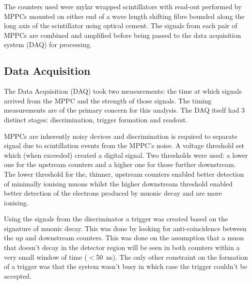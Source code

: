 \documentclass[]{article}
\begin{document}
The counters used were mylar wrapped scintillators with read-out performed by MPPCs mounted on either end of a wave length shifting fibre bounded along the long axis of the scintillator using optical cement. The signals from each pair of MPPCs are combined and amplified before being passed to the data acquisition system (DAQ) for processing.

\subsection{Data Acquisition} %
\label{sub:data_acquisition}
The Data Acquisition (DAQ) took two measurements: the time at which signals arrived from the MPPC and the strength of those signals. The timing measurements are of the primary concern for this analysis. The DAQ itself had 3 distinct stages: discrimination, trigger formation and readout.

MPPCs are inherently noisy devices and discrimination is required to separate signal due to scintillation events from the MPPC's noise. A voltage threshold set which (when exceeded) created a digital signal. Two thresholds were used: a lower one for the upstream counters and a higher one for those further downstream. The lower threshold for the, thinner, upstream counters enabled better detection of minimally ionising muons whilst the higher downstream threshold enabled better detection of the electrons produced by muonic decay and are more ionising. 

Using the signals from the discriminator a trigger was created based on the signature of muonic decay. This was done by looking for anti-coincidence between the up and downstream counters. This was done on the assumption that a muon that doesn't decay in the detector region will be seen in both counters within a very small window of time ($<$50~ns). The only other constraint on the formation of a trigger was that the system wasn't busy in which case the trigger couldn't be accepted.
\end{document}

